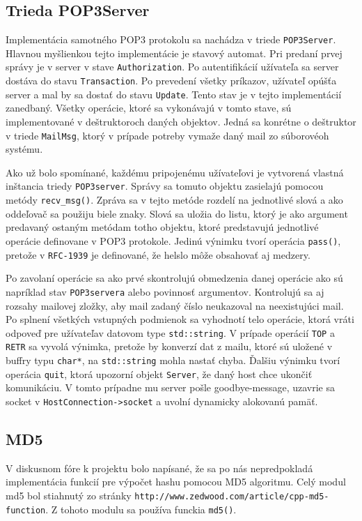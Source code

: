 \documentclass[a4paper, 11pt]{article}
\begin{document}
	\subsection{Trieda POP3Server}
	Implementácia samotného POP3 protokolu sa nachádza v triede {\tt POP3Server}. Hlavnou myšlienkou tejto implementácie je stavový automat. Pri predaní prvej správy je v server v stave {\tt Authorization}. Po autentifikácií užívateľa sa server dostáva do stavu {\tt Transaction}. Po prevedení všetky príkazov, užívateľ opúšťa server a mal by sa dostať do stavu {\tt Update}. Tento stav je v tejto implementácií zanedbaný. Všetky operácie, ktoré sa vykonávajú v tomto stave, sú implementované v deštruktoroch daných objektov. Jedná sa konrétne o deštruktor v triede {\tt MailMsg}, ktorý v prípade potreby vymaže daný mail zo súborovéoh systému.
	
	Ako už bolo spomínané, každému pripojenému užívateľovi je vytvorená vlastná inštancia triedy {\tt POP3server}. Správy sa tomuto objektu zasielajú pomocou metódy {\tt recv\_msg()}. Zpráva sa v tejto metóde rozdelí na jednotlivé slová a ako oddeľovač sa použiju biele znaky. Slová sa uložia do listu, ktorý je ako argument predavaný ostaným metódam totho objektu, ktoré predstavujú jednotlivé operácie definovane v POP3 protokole. Jedinú výnimku tvorí operácia {\tt pass()}, pretože v {\tt RFC-1939} je definované, že helslo môže obsahovať aj medzery.
	
	Po zavolaní operácie sa ako prvé skontrolujú obmedzenia danej operácie ako sú napríklad stav {\tt POP3servera} alebo povinnosť argumentov. Kontrolujú sa aj rozsahy mailovej zložky, aby mail zadaný číslo neukazoval na neexistujúci mail. Po splnení všetkých vstupných podmienok sa vyhodnotí telo operácie, ktorá vráti odpoveď pre užívateľav datovom type {\tt std::string}. V prípade operácií {\tt TOP} a {\tt RETR} sa vyvolá výnimka, pretože by konverzí dat z mailu, ktoré sú uložené v buffry typu {\tt char*}, na {\tt std::string} mohla nastať chyba. Ďalšiu výnimku tvorí operácia {\tt quit}, ktorá upozorní objekt {\tt Server}, že daný host chce ukončiť komunikáciu. V tomto prípadne mu server pošle goodbye-message, uzavrie sa socket v {\tt HostConnection->socket} a uvolní dynamicky alokovanú pamäť.  
	
	
	\subsection{MD5}
	V diskusnom fóre k projektu bolo napísané, že sa po nás nepredpokladá implementácia funkcií \linebreak pre výpočet hashu pomocou MD5 algoritmu. Celý modul {md5} bol stiahnutý zo stránky 
	\linebreak
	{\tt http://www.zedwood.com/article/cpp-md5-function}.  Z tohoto modulu sa používa funckia {\tt md5()}.
	
\end{document}
